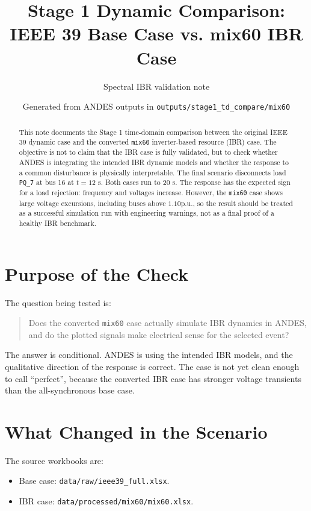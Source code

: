 \documentclass[11pt,letterpaper]{article}
\title{\textbf{Stage 1 Dynamic Comparison: IEEE 39 Base Case vs. mix60 IBR Case}}
\author{Spectral IBR validation note}
\date{Generated from ANDES outputs in \texttt{outputs/stage1\_td\_compare/mix60}}
\newcommand{\pu}{\mathrm{p.u.}}
\begin{document}
\maketitle

\begin{abstract}
This note documents the Stage 1 time-domain comparison between the original
IEEE 39 dynamic case and the converted \texttt{mix60} inverter-based resource
(IBR) case. The objective is not to claim that the IBR case is fully validated,
but to check whether ANDES is integrating the intended IBR dynamic models and
whether the response to a common disturbance is physically interpretable. The
final scenario disconnects load \texttt{PQ\_7} at bus 16 at \(t=12\) s. Both
cases run to \(20\) s. The response has the expected sign for a load rejection:
frequency and voltages increase. However, the \texttt{mix60} case shows large
voltage excursions, including buses above \(1.10 \pu\), so the result should be
treated as a successful simulation run with engineering warnings, not as a
final proof of a healthy IBR benchmark.
\end{abstract}

\section{Purpose of the Check}

The question being tested is:

\begin{quote}
Does the converted \texttt{mix60} case actually simulate IBR dynamics in ANDES,
and do the plotted signals make electrical sense for the selected event?
\end{quote}

The answer is conditional. ANDES is using the intended IBR models, and the
qualitative direction of the response is correct. The case is not yet clean
enough to call ``perfect'', because the converted IBR case has stronger voltage
transients than the all-synchronous base case.

\section{What Changed in the Scenario}

The source workbooks are:

\begin{itemize}
  \item Base case: \texttt{data/raw/ieee39\_full.xlsx}.
  \item IBR case: \texttt{data/processed/mix60/mix60.xlsx}.
\end{itemize}
\end{document}
